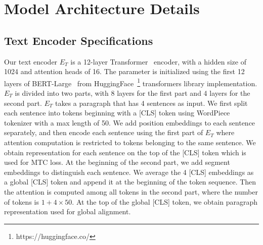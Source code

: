 \documentclass{article}
\begin{document}
\section{Model Architecture Details}\label{sec:app_model}
\subsection{Text Encoder Specifications}
Our text encoder $E_T$ is a 12-layer Transformer~\cite{vaswani2017transformer} encoder, with a hidden size of 1024 and attention heads of 16. 
The parameter is initialized using the first 12 layers of BERT-Large~\cite{Devlin2018bert} from HuggingFace~\footnote{https://huggingface.co/} transformers library implementation.
$E_T$ is divided into two parts, with 8 layers for the first part and 4 layers for the second part.
$E_T$ takes a paragraph that has 4 sentences as input.
We first split each sentence into tokens beginning with a [CLS] token using WordPiece tokenizer with a max length of 50. 
We add position embeddings to each sentence separately, and then encode each sentence using the first part of $E_T$ where attention computation is restricted to tokens belonging to the same sentence.
We obtain representation for each sentence on the top of the [CLS] token which is used for MTC loss.
At the beginning of the second part, we add segment embeddings to distinguish each sentence. We average the 4 [CLS] embeddings as a global [CLS] token and append it at the beginning of the  token sequence. 
Then the attention is computed among all tokens in the second part, where the number of tokens is $1+4 \times 50$. 
At the top of the global [CLS] token, we obtain paragraph representation used for global alignment.
\end{document}
